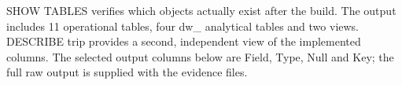 \documentclass[11pt,a4paper]{article}
\renewcommand{\arraystretch}{1.3}
\begin{document}
SHOW TABLES verifies which objects actually exist after the build. The output includes 11 operational tables, four dw\_\allowbreak{} analytical tables and two views. DESCRIBE trip provides a second, independent view of the implemented columns. The selected output columns below are Field, Type, Null and Key; the full raw output is supplied with the evidence files.

\noindent\begin{minipage}[t]{.29\linewidth}\vspace{0pt}\par\noindent\begin{minipage}{\linewidth}\setlength{\parskip}{0pt}\renewcommand{\arraystretch}{1.08}\titlespacing*{\subsection}{0pt}{7pt}{4pt}\lstset{aboveskip=4pt,belowskip=4pt}

\end{minipage}
\end{minipage}
\end{document}
